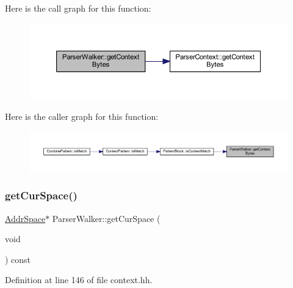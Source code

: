 Here is the call graph for this function\+:
\nopagebreak
\begin{figure}[H]
\begin{center}
\leavevmode
\includegraphics[width=350pt]{class_parser_walker_a630fe457e1473666fcad37cbba63b9a5_cgraph}
\end{center}
\end{figure}
Here is the caller graph for this function\+:
\nopagebreak
\begin{figure}[H]
\begin{center}
\leavevmode
\includegraphics[width=350pt]{class_parser_walker_a630fe457e1473666fcad37cbba63b9a5_icgraph}
\end{center}
\end{figure}
\mbox{\label{class_parser_walker_a6af3a4ebd3a69f52ebcae2dd197ffd11}} 
\subsubsection{\texorpdfstring{getCurSpace()}{getCurSpace()}}
{\footnotesize\ttfamily \mbox{\hyperlink{class_addr_space}{Addr\+Space}}$\ast$ Parser\+Walker\+::get\+Cur\+Space (\begin{DoxyParamCaption}\item[{void}]{ }\end{DoxyParamCaption}) const\hspace{0.3cm}{\ttfamily [inline]}}



Definition at line 146 of file context.\+hh.

